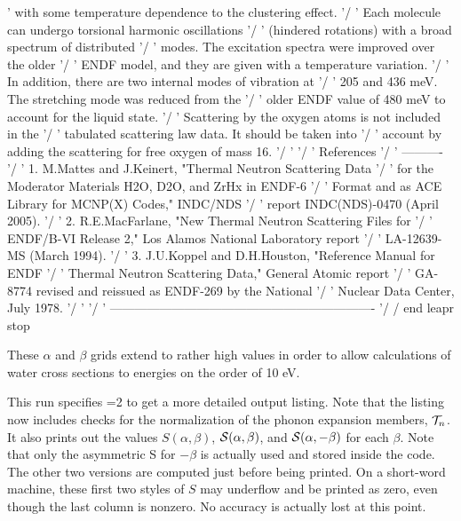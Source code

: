 \begin{ccode}
  ' with some temperature dependence to the clustering effect.       '/
  ' Each molecule can undergo torsional harmonic oscillations        '/
  ' (hindered rotations) with a broad spectrum of distributed        '/
  ' modes. The excitation spectra were improved over the older       '/
  ' ENDF model, and they are given with a temperature variation.     '/
  ' In addition, there are two internal modes of vibration at        '/
  ' 205 and 436 meV.  The stretching mode was reduced from the       '/
  ' older ENDF value of 480 meV to account for the liquid state.     '/
  ' Scattering by the oxygen atoms is not included in the            '/
  ' tabulated scattering law data.  It should be taken into          '/
  ' account by adding the scattering for free oxygen of mass 16.     '/
  '                                                                  '/
  ' References                                                       '/
  ' ----------                                                       '/
  ' 1. M.Mattes and J.Keinert, "Thermal Neutron Scattering Data      '/
  '    for the Moderator Materials H2O, D2O, and ZrHx in ENDF-6      '/
  '    Format and as ACE Library for MCNP(X) Codes," INDC/NDS        '/
  '    report INDC(NDS)-0470 (April 2005).                           '/
  ' 2. R.E.MacFarlane, "New Thermal Neutron Scattering Files for     '/
  '    ENDF/B-VI Release 2," Los Alamos National Laboratory report   '/
  '    LA-12639-MS (March 1994).                                     '/
  ' 3. J.U.Koppel and D.H.Houston, "Reference Manual for ENDF        '/
  '    Thermal Neutron Scattering Data," General Atomic report       '/
  '    GA-8774 revised and reissued as ENDF-269 by the National      '/
  '    Nuclear Data Center, July 1978.                               '/
  '                                                                  '/
  ' ---------------------------------------------------------------- '/
  /  end leapr
  stop

\end{ccode}
\normalsize

These $\alpha$ and $\beta$ grids extend to rather high values
in order to allow calculations of water cross sections to energies
on the order of 10 eV.

This run specifies =2 to get a more detailed output listing.
Note that the listing now includes checks for the normalization of the
phonon expansion members, ${\cal T}_n$.  It also prints out the values
$S(\alpha,\beta)$, ${\cal S}(\alpha,\beta)$, and ${\cal S}(\alpha,-\beta)$
for each $\beta$.  Note that only the asymmetric S for $-\beta$ is
actually used and stored inside the code.  The other two versions are
computed just before being printed.  On a short-word machine, these first
two styles of $S$ may underflow and be printed as zero, even though the
last column is nonzero.  No accuracy is actually lost at this point.


